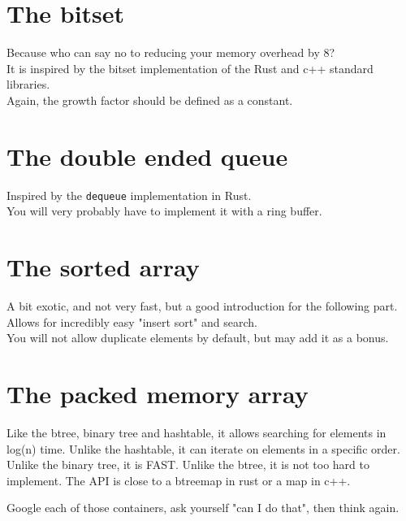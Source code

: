 \documentclass{42-en}
\begin{document}
    \section{The bitset}
    Because who can say no to reducing your memory overhead by 8?\\
    It is inspired by the bitset implementation of the Rust and c++ standard libraries.\\
    Again, the growth factor should be defined as a constant.

    \section{The double ended queue}
    Inspired by the \texttt{dequeue} implementation in Rust.\\
    You will very probably have to implement it with a ring buffer.

    \section{The sorted array}
    A bit exotic, and not very fast, but a good introduction for the following part.
    Allows for incredibly easy "insert sort" and search.\\
    You will not allow duplicate elements by default, but may add it as a bonus.

    \section{The packed memory array}
    Like the btree, binary tree and hashtable, it allows searching
    for elements in log(n) time. Unlike the hashtable, it can iterate on elements in
    a specific order. Unlike the binary tree, it is FAST. Unlike the btree,
    it is not too hard to implement. The API is close to a btreemap in rust or a map in c++.

    Google each of those containers, ask yourself "can I do that", then think again.



\end{document}
